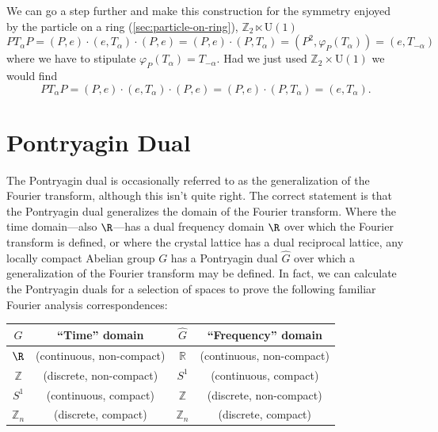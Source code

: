 \documentclass{report}
\begin{document}
We can go a step further and make this construction for the symmetry 
enjoyed by the particle on a ring (\cref{sec:particle-on-ring}), 
$ \mathbb{Z}_2 \ltimes \text{U}(1) $
\begin{equation*}
	P T_\alpha P 
		= (P, e ) \cdot (e, T_\alpha) \cdot (P, e)
		= (P, e) \cdot (P, T_\alpha) 
		= (P^2, \varphi_P(T_\alpha))
		= (e, T_{-\alpha})
\end{equation*}
where we have to stipulate $ \varphi_P(T_\alpha) = T_{-\alpha} $. Had we just 
used $ \mathbb{Z}_2 \times \text{U}(1) $ we would find 
\begin{equation*}
	P T_\alpha P 
		= (P, e ) \cdot (e, T_\alpha) \cdot (P, e)
		= (P, e) \cdot (P, T_\alpha) 
		= (e, T_\alpha).
\end{equation*}


\section{Pontryagin Dual}
The Pontryagin dual is occasionally referred to as the generalization of the 
Fourier transform, although this isn't quite right. The correct statement is that 
the Pontryagin dual generalizes the domain of the Fourier transform. Where the 
time domain---also $ \R $---has a dual frequency domain $ \R $ over which the
Fourier transform is defined, or where the crystal lattice has a dual reciprocal
lattice, any locally compact Abelian group $ G $ has a Pontryagin dual $
\widehat{G} $ over which a generalization of the Fourier transform may be
defined. In fact, we can calculate the Pontryagin duals for a selection of spaces 
to prove the following familiar Fourier analysis correspondences: 
\begin{table}[h]
\centering
\begin{tabular}{c c c c}
$ G $ & \textbf{``Time'' domain} & $ \widehat{G} $ & \textbf{``Frequency'' domain}\\ \hline
$ \R $ & (continuous, non-compact) & $\mathbb{R}$ & (continuous, non-compact) \\ 
$ \mathbb{Z} $ & (discrete, non-compact) & $S^1$ &  (continuous, compact) \\ 
$ S^1 $ & (continuous, compact) & $ \mathbb{Z} $ & (discrete, non-compact) \\ 
$ \mathbb{Z}_n $ & (discrete, compact) & $ \mathbb{Z}_n $ & (discrete, compact) \\
\end{tabular}
\end{table}
\end{document}
